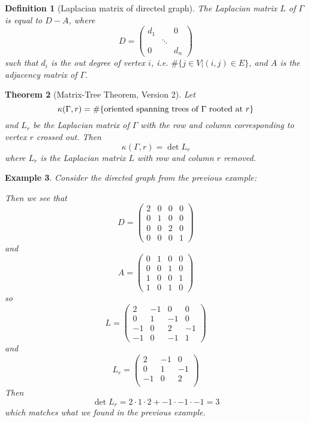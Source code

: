 \documentclass[11pt]{article}
\newtheorem{theorem}{Theorem}
\newtheorem{definition}[theorem]{Definition}
\newtheorem{example}[theorem]{Example}
\begin{document}
\begin{definition}[Laplacian matrix of directed graph]
The Laplacian matrix $L$ of $\Gamma$ is equal to $D - A$, where
$$
D = \begin{pmatrix}
d_1 & & 0 \\
& \ddots & \\
0 & & d_n
\end{pmatrix}
$$
such that $d_i$ is the out degree of vertex $i$, i.e. $\#\{j \in V | (i,j) \in E\}$, and $A$ is the adjacency matrix of $\Gamma$.
\end{definition}

\begin{theorem}[Matrix-Tree Theorem, Version 2]
Let $$\kappa(\Gamma,r) = \#\{\textup{oriented spanning trees of $\Gamma$ rooted at $r$}\}$$ and $L_r$ be the Laplacian matrix of $\Gamma$ with the row and column corresponding to vertex $r$ crossed out.  Then
$$\kappa(\Gamma,r) = \det{L_r}$$
where $L_r$ is the Laplacian matrix $L$ with row and column $r$ removed.
\end{theorem}

\begin{example}
Consider the directed graph from the previous example:
\begin{center}
\end{center}
Then we see that
$$
D = \begin{pmatrix}
2 & 0 & 0 & 0 \\
0 & 1 & 0 & 0 \\
0 & 0 & 2 & 0 \\
0 & 0 & 0 & 1
\end{pmatrix}
$$
and
$$
A = \begin{pmatrix}
0 & 1 & 0 & 0 \\
0 & 0 & 1 & 0 \\
1 & 0 & 0 & 1 \\
1 & 0 & 1 & 0
\end{pmatrix}
$$
so
$$
L = \begin{pmatrix}
2 & -1 & 0 & 0 \\
0 & 1 & -1 & 0 \\
-1 & 0 & 2 & -1 \\
-1 & 0 & -1 & 1
\end{pmatrix}
$$
and
$$
L_r = \begin{pmatrix}
2 & -1 & 0 \\
0 & 1 & -1 \\
-1 & 0 & 2 \\
\end{pmatrix}
$$
Then
$$ \det{L_r} = 2 \cdot 1 \cdot 2 + -1 \cdot -1 \cdot -1 = 3$$
which matches what we found in the previous example.
\end{example}
\end{document}

